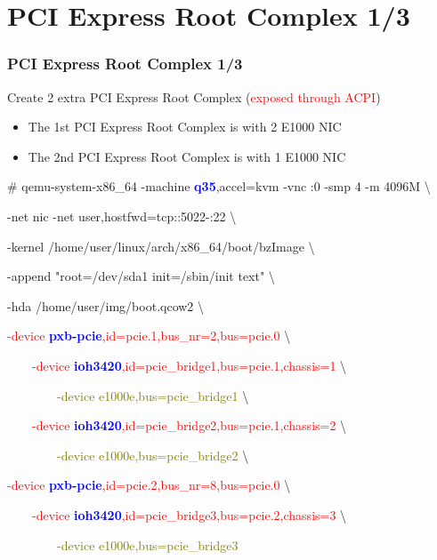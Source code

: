 \documentclass[aspectratio=169]{beamer}
\begin{document}
\section{PCI Express Root Complex 1/3}
\begin{frame}
\frametitle{PCI Express Root Complex 1/3}
{\Large Create 2 extra PCI Express Root Complex (\textcolor{red}{exposed through ACPI})}
\begin{itemize}
\item The 1st PCI Express Root Complex is with 2 E1000 NIC
\item The 2nd PCI Express Root Complex is with 1 E1000 NIC
\end{itemize}
\begin{block}{}
\small
\# qemu-system-x86\_64 -machine \textbf{\textcolor{blue}{q35}},accel=kvm -vnc :0 -smp 4 -m 4096M \textbackslash

-net nic -net user,hostfwd=tcp::5022-:22 \textbackslash

-kernel /home/user/linux/arch/x86\_64/boot/bzImage \textbackslash
	
-append "root=/dev/sda1 init=/sbin/init text" \textbackslash

-hda /home/user/img/boot.qcow2 \textbackslash

\textcolor{red}{-device \textbf{\textcolor{blue}{pxb-pcie}},id=pcie.1,bus\_nr=2,bus=pcie.0} \textbackslash

\textcolor{red}{\ \ \ \ -device \textbf{\textcolor{blue}{ioh3420}},id=pcie\_bridge1,bus=pcie.1,chassis=1} \textbackslash

\textcolor{olive}{\ \ \ \ \ \ \ \ -device e1000e,bus=pcie\_bridge1} \textbackslash

\textcolor{red}{\ \ \ \ -device \textbf{\textcolor{blue}{ioh3420}},id=pcie\_bridge2,bus=pcie.1,chassis=2} \textbackslash

\textcolor{olive}{\ \ \ \ \ \ \ \ -device e1000e,bus=pcie\_bridge2} \textbackslash

\textcolor{red}{-device \textbf{\textcolor{blue}{pxb-pcie}},id=pcie.2,bus\_nr=8,bus=pcie.0} \textbackslash

\textcolor{red}{\ \ \ \ -device \textbf{\textcolor{blue}{ioh3420}},id=pcie\_bridge3,bus=pcie.2,chassis=3} \textbackslash

\textcolor{olive}{\ \ \ \ \ \ \ \ -device e1000e,bus=pcie\_bridge3}

\end{block}
\end{frame}

\end{document}
